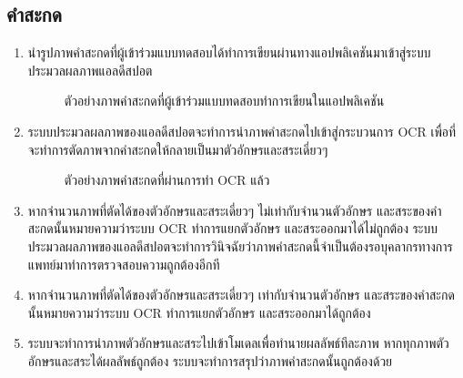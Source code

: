 \documentclass[12pt,oneside,openright,a4paper]{cpe-thai-project}
\begin{document}
\subsection{คำสะกด}
\begin{enumerate}
  \item นำรูปภาพคำสะกดที่ผู้เข้าร่วมแบบทดสอบได้ทำการเขียนผ่านทางแอปพลิเคชันมาเข้าสู่ระบบประมวลผลภาพแอลดีสปอต
  \begin{figure}[!h]\centering
    \setlength{\fboxrule}{0.2mm} %
    \setlength{\fboxsep}{1cm}
    \caption{ตัวอย่างภาพคำสะกดที่ผู้เข้าร่วมแบบทดสอบทำการเขียนในแอปพลิเคชัน}\label{fig:system}                  
   \end{figure}
  \item ระบบประมวลผลภาพของแอลดีสปอตจะทำการนำภาพคำสะกดไปเข้าสู่กระบวนการ OCR เพื่อที่จะทำการตัดภาพจากคำสะกดให้กลายเป็นมาตัวอักษรและสระเดี่ยวๆ
  \begin{figure}[!h]\centering
    \setlength{\fboxrule}{0.2mm} %
    \setlength{\fboxsep}{1cm}
    \caption{ตัวอย่างภาพคำสะกดที่ผ่านการทำ OCR แล้ว}\label{fig:system}                  
   \end{figure}
  \item หากจำนวนภาพที่ตัดได้ของตัวอักษรและสระเดี่ยวๆ ไม่เท่ากับจำนวนตัวอักษร และสระของคำสะกดนั้นหมายความว่าระบบ OCR ทำการแยกตัวอักษร และสระออกมาได้ไม่ถูกต้อง 
  ระบบประมวลผลภาพของแอลดีสปอตจะทำการวินิจฉัยว่าภาพคำสะกดนี้จำเป็นต้องรอบุคลากรทางการแพทย์มาทำการตรวจสอบความถูกต้องอีกที
  \item หากจำนวนภาพที่ตัดได้ของตัวอักษรและสระเดี่ยวๆ เท่ากับจำนวนตัวอักษร และสระของคำสะกดนั้นหมายความว่าระบบ OCR ทำการแยกตัวอักษร และสระออกมาได้ถูกต้อง
  \item ระบบจะทำการนำภาพตัวอักษรและสระไปเข้าโมเดลเพื่อทำนายผลลัพธ์ทีละภาพ หากทุกภาพตัวอักษรและสระได้ผลลัพธ์ถูกต้อง ระบบจะทำการสรุปว่าภาพคำสะกดนั้นถูกต้องด้วย
\end{enumerate}  
\end{document}

